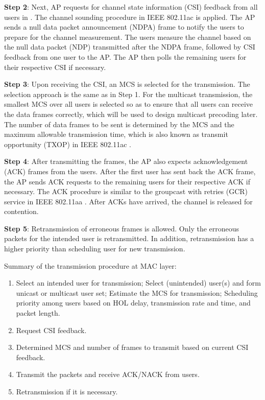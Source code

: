 \documentclass[conference]{IEEEtran}
\newcommand{\0}{\vect{0}}
\newcommand{\1}{\vect{1}}
\begin{document}
{\bf Step 2}: Next, AP requests for channel state information (CSI) feedback from all users in . The channel sounding procedure in IEEE 802.11ac \cite{IEEE13AC} is applied. The AP sends a null data packet  announcement (NDPA) frame to notify the users to prepare for the channel measurement. The users measure the channel based on the null data packet (NDP) transmitted after the NDPA frame, followed by CSI feedback from one user to the AP. The AP then polls the remaining users for their respective CSI  if necessary.

{\bf Step 3}: Upon receiving the CSI, an MCS is selected for the transmission. The selection approach is the same as in Step 1. For the multicast transmission, the smallest MCS over all users is selected so as to ensure that all users can receive the data frames correctly, which will be used to design multicast precoding later. The number of data frames to be sent is determined by the MCS and the maximum allowable transmission time, which is also known as transmit opportunity (TXOP) in IEEE 802.11ac \cite{IEEE13AC}.

{\bf Step 4}:
After transmitting the frames, the AP also expects acknowledgement (ACK) frames from the users. After the first user has sent back the ACK frame, the AP sends ACK requests to the remaining users for their respective ACK if necessary. The ACK procedure is similar to the groupcast with retries (GCR) service in IEEE 802.11aa \cite{IEEE12AA}. After ACKs have arrived, the channel is released for contention.

{\bf Step 5}: Retransmission of erroneous frames is allowed. Only the erroneous packets for the intended user is retransmitted. In addition, retransmission has a higher priority than scheduling user for new transmission.

Summary of the transmission procedure at MAC layer:


\begin{framed}
\begin{enumerate}[Step~1:]
\item Select an intended user for transmission; Select (unintended) user(s) and form unicast or multicast user set; Estimate the MCS for transmission; Scheduling priority among users based on HOL delay, transmission rate and time, and packet length.
\item Request CSI feedback.
\item Determined MCS and number of frames to transmit based on current CSI feedback.
\item Transmit the packets and receive ACK/NACK from users.
\item Retransmission if it is necessary.
\end{enumerate}
\end{framed}
\end{document}
